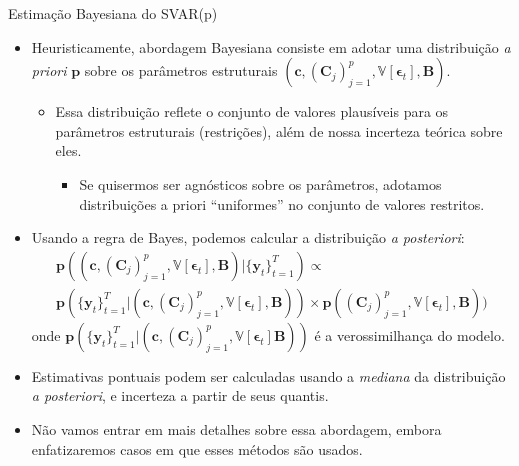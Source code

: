 \documentclass[11pt]{beamer}
\begin{document}
\begin{frame}{Estimação Bayesiana do SVAR(p)}
	\begin{itemize}
	 	\item Heuristicamente, abordagem Bayesiana consiste em adotar uma distribuição \textit{a priori} $\boldsymbol{p}$ sobre os parâmetros estruturais $(\boldsymbol{c}, (\boldsymbol{C}_j)_{j=1}^p,\mathbb{V}[\boldsymbol{\epsilon}_t], \boldsymbol{B})$.
		\begin{itemize}
			\item Essa distribuição reflete o conjunto de valores plausíveis para os parâmetros estruturais (restrições), além de nossa incerteza teórica sobre eles.
			\begin{itemize}
				\item Se quisermos ser agnósticos sobre os parâmetros, adotamos distribuições a priori ``uniformes'' no conjunto de valores restritos.
			\end{itemize}
		\end{itemize}
		\item Usando a regra de Bayes, podemos calcular {\color{blue}a distribuição \textit{a posteriori}}:
		\begin{equation*}
			\begin{aligned}
				\boldsymbol{p}((\boldsymbol{c}, (\boldsymbol{C}_j)_{j=1}^p, \mathbb{V}[\boldsymbol{\epsilon}_t], \boldsymbol{B})| \{\boldsymbol{y}_t\}_{t=1}^T) \propto \\ \boldsymbol{p}(\{\boldsymbol{y}_t\}_{t=1}^T|(\boldsymbol{c}, (\boldsymbol{C}_j)_{j=1}^p,\mathbb{V}[\boldsymbol{\epsilon}_t], \boldsymbol{B})) \times \boldsymbol{p}((\boldsymbol{C}_j)_{j=1}^p,\mathbb{V}[\boldsymbol{\epsilon}_t], \boldsymbol{B})) 
			\end{aligned}
		\end{equation*}
		onde $\boldsymbol{p}(\{\boldsymbol{y}_t\}_{t=1}^T|(\boldsymbol{c}, (\boldsymbol{C}_j)_{j=1}^p,\mathbb{V}[\boldsymbol{\epsilon}_t]\boldsymbol{B}))$ é a verossimilhança do modelo.
		\item Estimativas pontuais podem ser calculadas usando a \textit{mediana} da distribuição \textit{a posteriori}, e incerteza a partir de seus quantis.
		\item Não vamos entrar em mais detalhes sobre essa abordagem, embora enfatizaremos casos em que esses métodos são usados.
	\end{itemize}
\end{frame}
\end{document}
